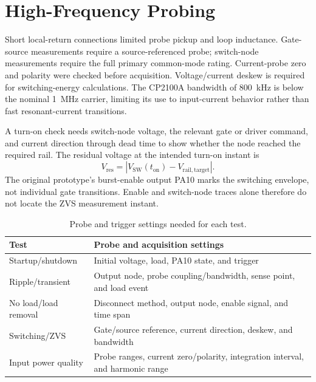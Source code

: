 \section{High-Frequency Probing}
\label{sec:method-probing}

Short local-return connections limited probe pickup and loop inductance.
Gate-source measurements require a source-referenced probe; switch-node
measurements require the full primary common-mode rating. Current-probe zero
and polarity were checked before acquisition. Voltage/current deskew is
required for switching-energy calculations. The CP2100A bandwidth of
\SI{800}{\kilo\hertz} is below the nominal \SI{1}{\mega\hertz} carrier,
limiting its use to input-current behavior rather than fast resonant-current
transitions.

A turn-on check needs switch-node voltage, the relevant gate or driver command,
and current direction through dead time to show whether the node reached the
required rail. The residual voltage at the intended turn-on instant is
\begin{equation}
 V_{\mathrm{res}}=
 \left|V_{\mathrm{SW}}(t_{\mathrm{on}})
 -V_{\mathrm{rail,target}}\right|.
 \label{eq:zvs-residual-method}
\end{equation}
The original prototype's burst-enable output PA10 marks the switching envelope,
not individual gate transitions. Enable and switch-node traces alone therefore
do not locate the ZVS measurement instant.

\begin{table}[htbp]
\centering
\caption{Probe and trigger settings needed for each test.}
\label{tab:probe-role-map}
\begin{tabularx}{\textwidth}{@{}p{}X@{}}
\toprule
Test & Probe and acquisition settings\\
\midrule
Startup/shutdown & Initial voltage, load, PA10 state, and trigger\\
Ripple/transient & Output node, probe coupling/bandwidth, sense point, and load event\\
No load/load removal & Disconnect method, output node, enable signal, and time span\\
Switching/ZVS & Gate/source reference, current direction, deskew, and bandwidth\\
Input power quality & Probe ranges, current zero/polarity, integration interval, and harmonic range\\
\bottomrule
\end{tabularx}
\end{table}
